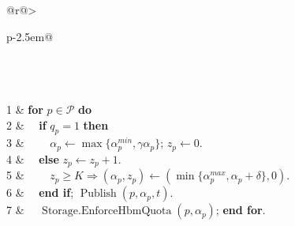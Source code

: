 \begin{algorithm}[b]
\caption{\textsc{HBMQuotaAIMD}: Peer-HBM protection share}
\label{alg:guarded-aimd}
\begin{tabular}{@{}r@{\hspace{0.5em}}>{\raggedright\arraybackslash}p{\dimexpr\columnwidth-2.5em\relax}@{}}
\\
\\
\\
1 & \textbf{for} $p\in\mathcal P$ \textbf{do}\\
2 & $\quad$\textbf{if} $q_p=1$ \textbf{then}\\
3 & $\qquad\alpha_p\gets\max\{\alpha_p^{min},\gamma\alpha_p\}$; $z_p\gets0$.\\
4 & $\quad$\textbf{else} $z_p\gets z_p+1$.\\
5 & $\qquad z_p\ge K\Rightarrow(\alpha_p,z_p)\gets(\min\{\alpha_p^{max},\alpha_p+\delta\},0)$.\\
6 & $\quad$\textbf{end if}; $\operatorname{Publish}(p,\alpha_p,t)$.\\
7 & $\quad\operatorname{Storage.EnforceHbmQuota}(p,\alpha_p)$; \textbf{end for}.\\
\end{tabular}
\end{algorithm}
